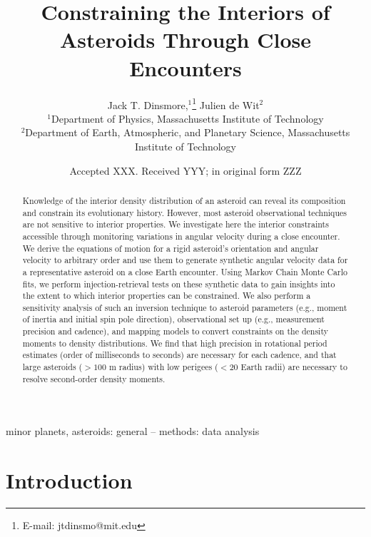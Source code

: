 \documentclass[fleqn,usenatbib]{mnras}
\title[Flyby Constraints on Asteroids Interiors]{Constraining the Interiors of Asteroids Through Close Encounters}
\author[Jack T. Dinsmore, Julien de Wit]{
Jack T. Dinsmore,$^{1}$\thanks{E-mail: jtdinsmo@mit.edu}
Julien de Wit$^{2}$
\\
$^{1}$Department of Physics, Massachusetts Institute of Technology\\
$^{2}$Department of Earth, Atmospheric, and Planetary Science, Massachusetts Institute of Technology
}
\date{Accepted XXX. Received YYY; in original form ZZZ}
\begin{document}
\label{firstpage}
\pagerange{\pageref{firstpage}--\pageref{lastpage}}
\maketitle

\begin{abstract}
  Knowledge of the interior density distribution of an asteroid can reveal its composition and constrain its evolutionary history. However, most asteroid observational techniques are not sensitive to interior properties. We investigate here the interior constraints accessible through monitoring variations in angular velocity during a close encounter. We derive the equations of motion for a rigid asteroid's orientation and angular velocity to arbitrary order and use them to generate synthetic angular velocity data for a representative asteroid on a close Earth encounter. Using Markov Chain Monte Carlo fits, we perform injection-retrieval tests on these synthetic data to gain insights into the extent to which interior properties can be constrained. We also perform a sensitivity analysis of such an inversion technique to asteroid parameters (e.g., moment of inertia and initial spin pole direction), observational set up (e.g., measurement precision and cadence), and mapping models to convert constraints on the density moments to density distributions. We find that high precision in rotational period estimates (order of milliseconds to seconds) are necessary for each cadence, and that large asteroids ($> 100$ m radius) with low perigees ($<20$ Earth radii) are necessary to resolve second-order density moments.
\end{abstract}

\begin{keywords}
  minor planets, asteroids: general -- methods: data analysis
\end{keywords}



\section{Introduction}
\end{document}

